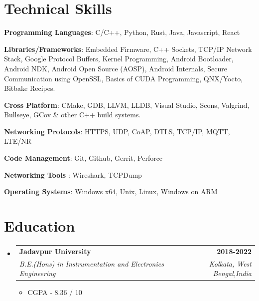 \documentclass[letterpaper,11pt]{article}
\makeatletter
\newcommand{\resumeItem}[1]{
  \item\small{
    {\justifying #1 \vspace{-2pt}}
  }
}
\newcommand{\resumeSubheading}[4]{
  \vspace{-2pt}\item
    \begin{tabular*}{1.0\textwidth}[t]{l@{\extracolsep{\fill}}r}
      \textbf{#1} & \textbf{\small #2} \\
      \textit{\small#3} & \textit{\small #4} \\
    \end{tabular*}\vspace{-7pt}
}
\newcommand{\resumeSubHeadingListStart}{\begin{itemize}[leftmargin=0.0in, label={}]}
\newcommand{\resumeSubHeadingListEnd}{\end{itemize}}
\newcommand{\resumeItemListStart}{\begin{itemize}}
\newcommand{\resumeItemListEnd}{\end{itemize}\vspace{-5pt}}
\makeatother
\begin{document}
\section{Technical Skills}
 \begin{itemize}[leftmargin=0.3in, itemsep=1pt, topsep=2pt, parsep=0pt]
    \small{\item{
     \textbf{Programming Languages}{: C/C++, Python, Rust, Java, Javascript, React}
    }}
    \small{\item{
     \textbf{Libraries/Frameworks}{: Embedded Firmware, C++ Sockets, TCP/IP Network Stack, Google Protocol Buffers, Kernel Programming, Android Bootloader, Android NDK, Android Open Source (AOSP), Android Internals, Secure Communication using OpenSSL, Basics of CUDA Programming, QNX/Yocto, Bitbake Recipes.}
    }}
    \small{\item{
     \textbf{Cross Platform}{: CMake, GDB, LLVM, LLDB, Visual Studio, Scons, Valgrind, Bullseye, GCov \& other C++ build systems.}
    }}
    \small{\item{
     \textbf{Networking Protocols}{: HTTPS, UDP, CoAP, DTLS, TCP/IP, MQTT, LTE/NR}
    }}
    \small{\item{
     \textbf{Code Management}{: Git, Github, Gerrit, Perforce }
    }}
    \small{\item{
     \textbf{Networking Tools }{: Wireshark, TCPDump }
    }}
    \small{\item{
     \textbf{Operating Systems}{: Windows x64, Unix, Linux, Windows on ARM}
    }}
 \end{itemize}
 \vspace{-10pt}

\section{Education}
  \resumeSubHeadingListStart
  \resumeSubheading
    {Jadavpur University}{2018-2022}
      {B.E.(Hons) in Instrumentation and Electronics Engineering}{Kolkata, West Bengal,India}
      \resumeItemListStart
      \resumeItem{CGPA - 8.36 / 10}
      \resumeItemListEnd
  \resumeSubHeadingListEnd
\vspace{-10pt}

\end{document}
